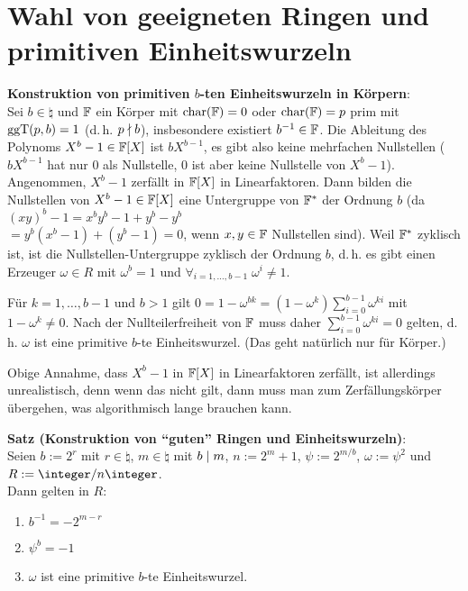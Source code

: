 \section{%
    Wahl von geeigneten Ringen und primitiven Einheitswurzeln%
}

\textbf{Konstruktion von primitiven $b$-ten Einheitswurzeln in Körpern}:\\
Sei $b \in \natural$ und $\mathbb{F}$ ein Körper mit $\operatorname{char}(\mathbb{F}) = 0$ oder $\operatorname{char}(\mathbb{F}) = p$ prim
mit $\operatorname{ggT}(p, b) = 1$ (d.\,h. $p \nmid b$),
insbesondere existiert $b^{-1} \in \mathbb{F}$.
Die Ableitung des Polynoms $X^b - 1 \in \mathbb{F}[X]$ ist $bX^{b-1}$,
es gibt also keine mehrfachen Nullstellen
($bX^{b-1}$ hat nur $0$ als Nullstelle, $0$ ist aber keine Nullstelle von $X^b - 1$).
Angenommen, $X^b - 1$ zerfällt in $\mathbb{F}[X]$ in Linearfaktoren.
Dann bilden die Nullstellen von $X^b - 1 \in \mathbb{F}[X]$ eine Untergruppe von $\mathbb{F}^\ast$
der Ordnung $b$
(da $(xy)^b - 1 = x^b y^b - 1 + y^b - y^b$\\
$= y^b (x^b - 1) + (y^b - 1) = 0$,
wenn $x, y \in \mathbb{F}$ Nullstellen sind).
Weil $\mathbb{F}^\ast$ zyklisch ist, ist die Nullstellen-Untergruppe zyklisch der Ordnung $b$,
d.\,h. es gibt einen Erzeuger $\omega \in R$ mit $\omega^b = 1$ und
$\forall_{i=1,\dotsc,b-1}\; \omega^i \not= 1$.

Für $k = 1, \dotsc, b - 1$ und $b > 1$ gilt
$0 = 1 - \omega^{bk} = (1 - \omega^k) \sum_{i=0}^{b-1} \omega^{ki}$ mit
$1 - \omega^k \not= 0$.
Nach der Nullteilerfreiheit von $\mathbb{F}$ muss daher $\sum_{i=0}^{b-1} \omega^{ki} = 0$ gelten,
d.\,h. $\omega$ ist eine primitive $b$-te Einheitswurzel.
(Das geht natürlich nur für Körper.)

Obige Annahme, dass $X^b - 1$ in $\mathbb{F}[X]$ in Linearfaktoren zerfällt, ist allerdings
unrealistisch, denn wenn das nicht gilt, dann muss man zum Zerfällungskörper übergehen,
was algorithmisch lange brauchen kann.

\linie

\textbf{Satz (Konstruktion von "`guten"' Ringen und Einheitswurzeln)}:\\
Seien $b := 2^r$ mit $r \in \natural$,
$m \in \natural$ mit $b \mid m$,
$n := 2^m + 1$,
$\psi := 2^{m/b}$,
$\omega := \psi^2$ und
$R := \ZnZ$.\\
Dann gelten in $R$:
\begin{enumerate}
    \item
    $b^{-1} = -2^{m-r}$

    \item
    $\psi^b = -1$

    \item
    $\omega$ ist eine primitive $b$-te Einheitswurzel.
\end{enumerate}


